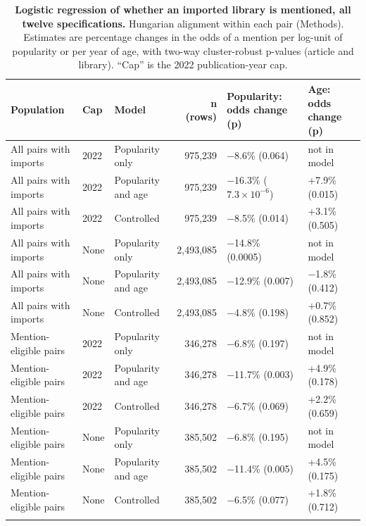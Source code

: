 \documentclass[pdflatex,sn-nature]{sn-jnl}%
\begin{document}

\begin{table}
\caption{\textbf{Logistic regression of whether an imported library is mentioned, all twelve specifications.} Hungarian alignment within each pair (Methods). Estimates are percentage changes in the odds of a mention per log-unit of popularity or per year of age, with two-way cluster-robust p-values (article and library). ``Cap'' is the 2022 publication-year cap.}\label{stab:logit}
\begin{tabular}{@{}lllrll@{}}
\toprule
Population & Cap & Model & n (rows) & Popularity: odds change (p) & Age: odds change (p) \\
\midrule
All pairs with imports & 2022 & Popularity only & 975,239 & $-$8.6\% (0.064) & not in model \\
All pairs with imports & 2022 & Popularity and age & 975,239 & $-$16.3\% ($7.3\times10^{-6}$) & +7.9\% (0.015) \\
All pairs with imports & 2022 & Controlled & 975,239 & $-$8.5\% (0.014) & +3.1\% (0.505) \\
All pairs with imports & None & Popularity only & 2,493,085 & $-$14.8\% (0.0005) & not in model \\
All pairs with imports & None & Popularity and age & 2,493,085 & $-$12.9\% (0.007) & $-$1.8\% (0.412) \\
All pairs with imports & None & Controlled & 2,493,085 & $-$4.8\% (0.198) & +0.7\% (0.852) \\
Mention-eligible pairs & 2022 & Popularity only & 346,278 & $-$6.8\% (0.197) & not in model \\
Mention-eligible pairs & 2022 & Popularity and age & 346,278 & $-$11.7\% (0.003) & +4.9\% (0.178) \\
Mention-eligible pairs & 2022 & Controlled & 346,278 & $-$6.7\% (0.069) & +2.2\% (0.659) \\
Mention-eligible pairs & None & Popularity only & 385,502 & $-$6.8\% (0.195) & not in model \\
Mention-eligible pairs & None & Popularity and age & 385,502 & $-$11.4\% (0.005) & +4.5\% (0.175) \\
Mention-eligible pairs & None & Controlled & 385,502 & $-$6.5\% (0.077) & +1.8\% (0.712) \\
\botrule
\end{tabular}
\end{table}
\end{document}

